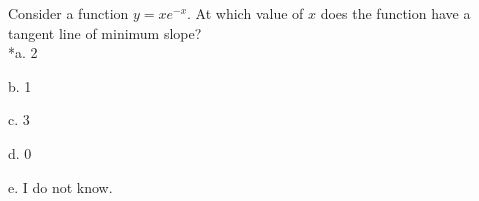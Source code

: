 
Consider a function \( y = xe^{- x} \). At which value of \( x \) does the function have a tangent line of minimum slope?\\

*a. 2

b. 1

c. 3

d. 0

e. I do not know.\\
